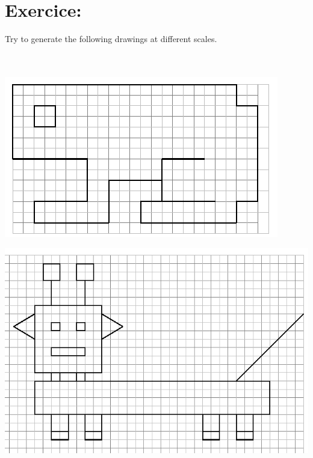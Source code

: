 \section{Exercice:}
\noindent Try to generate the following drawings at different scales.\\ \\ \\
\begin{center}
\includegraphics[scale=0.6]{pics/variables-grenouille.png}
\end{center}
\begin{center}
\includegraphics[scale=0.75]{pics/variables-robot.png}
\end{center}
